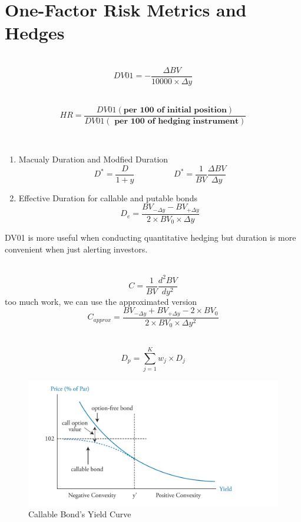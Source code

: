 \documentclass[11pt,fleqn]{book} %
\numberwithin{equation}{section} %
\numberwithin{figure}{section} %
\numberwithin{table}{section} %
\begin{document}
\chapter{One-Factor Risk Metrics and Hedges}
\begin{definition}[DV01]\textbf{}\\
    $$
    DV01=-\frac{\Delta BV}{10000\times \Delta y}
    $$
\end{definition}
\begin{theorem}\textbf{}\\
$$
HR=\frac{DV01 (\textbf{per 100 of initial position})}{DV01 (\textbf{ per 100 of hedging instrument})}
$$
\end{theorem}
\begin{definition}[Duration]\textbf{}\\
\begin{enumerate}
    \item Macualy Duration and Modfied Duration
    $$
    D^*=\frac{D}{1+y}\hspace{2cm}D^*=\frac{1}{BV}\frac{\Delta BV}{\Delta y}
    $$
    \item Effective Duration for callable and putable bonds 
    $$
    D_e=\frac{BV_{-\Delta y}-BV_{+\Delta y}}{2\times BV_0\times\Delta y}
    $$
\end{enumerate}    
\end{definition}
\begin{remark}
    DV01 is more useful when conducting quantitative hedging but duration is more convenient
    when just alerting investors.
\end{remark}
\begin{definition}[Convexity]\textbf{}\\
    $$
    C=\frac{1}{BV}\frac{d^2BV}{dy^2}
    $$
    too much work, we can use the approximated version
    $$
    C_{approx}=\frac{BV_{-\Delta y}+BV_{+\Delta y}-2\times BV_0}{2\times BV_0\times\Delta y^2}
    $$
\end{definition}
\begin{theorem}\textbf{}\\
    $$
    D_p=\sum_{j=1}^Kw_j\times D_j
    $$
\end{theorem}
\begin{figure}[h!]
    \centering
    \includegraphics[scale=0.7]{Bendover.png}
    \caption{Callable Bond's Yield Curve}
\end{figure}
\end{document}
